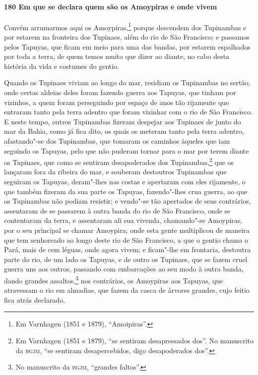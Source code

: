 \paragraph{180 Em que se declara quem são os Amoypiras e onde vivem}

Convém arrumarmos aqui os Amoypiras,\footnote{ Em Varnhagen (1851 e 1879), ``Amoipiras''.}
porque descendem dos Tupinambas e por estarem na fronteira dos Tupinaes, além do rio de
São Francisco; e passamos pelos Tapuyas, que ficam em meio para uma das bandas, por
estarem espalhados por toda a terra, de quem temos muito que dizer ao diante, no cabo
desta história da vida e costumes do gentio.

Quando os Tupinaes viviam ao longo do mar, residiam os Tupinambas no sertão, onde certas
aldeias deles foram fazendo guerra aos Tapuyas, que tinham por vizinhos, a quem foram
perseguindo por espaço de anos tão rijamente que entraram tanto pela terra adentro que
foram vizinhar com o rio de São Francisco. E neste tempo, outros Tupinambas fizeram
despejar aos Tupinaes de junto do mar da Bahia, como já fica dito, os quais os meteram
tanto pela terra adentro, afastando"-se dos Tupinambas, que tomaram os caminhos àqueles que
iam seguindo os Tapuyas, pelo que não puderam tornar para o mar por terem diante os
Tupinaes, que como se sentiram desapoderados dos Tupinambas,\footnote{ Em Varnhagen (1851
e 1879), ``se sentiram desapressados dos''. No manuscrito da \textsc{bgjm}, ``se sentiram
desapercebidos, digo desapoderados dos''.} que os lançaram fora da ribeira do mar, e
souberam destoutros Tupinambas que seguiram os Tapuyas, deram"-lhes nas costas e apertaram
com eles rijamente, o que também fizeram da sua parte os Tapuyas, fazendo"-lhes crua
guerra, ao que os Tupinambas não podiam resistir; e vendo"-se tão apertados de seus
contrários, assentaram de se passarem à outra banda do rio de São Francisco, onde se
contentaram da terra, e assentaram ali sua vivenda, chamando"-se Amoypiras, por o seu
principal se chamar Amoypira; onde esta gente multiplicou de maneira que tem senhoreado ao
longo deste rio de São Francisco, a que o gentio chama o Pará, mais de cem léguas, onde
agora vivem; e ficam"-lhe em frontaria, destoutra parte do rio, de um lado os Tapuyas, e de
outro os Tupinaes, que se fazem cruel guerra uns aos outros, passando com embarcações ao
seu modo à outra banda, dando grandes assaltos,\footnote{ No manuscrito da \textsc{bgjm},
``grandes faltos''.} nos contrários, os Amoypiras aos Tapuyas, que atravessam o rio em
almadias, que fazem da casca de árvores grandes, cujo feitio fica atrás declarado.

